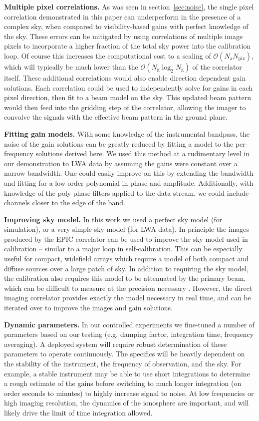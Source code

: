 \documentclass[a4paper,fleqn,usenatbib]{mnras}
\newcommand{\Nant}{\ensuremath{N_{\mathrm{a}}}}
\newcommand{\Ng}{\ensuremath{N_{\mathrm{g}}}}
\begin{document}
\textbf{Multiple pixel correlations.} As was seen in section~\ref{sec:noise}, the single pixel correlation demonstrated in this paper can underperform in the presence of a complex sky, when compared to visibility-based gains with perfect knowledge of the sky. These errors can be mitigated by using correlations of multiple image pixels to incorporate a higher fraction of the total sky power into the calibration loop. Of course this increases the computational cost to a scaling of $\mathcal{O}(\Nant N_{\mathrm{pix}})$, which will typically be much lower than the $\mathcal{O}(\Ng \log_2 \Ng)$ of the correlator itself. These additional correlations would also enable direction dependent gain solutions. Each correlation could be used to independently solve for gains in each pixel direction, then fit to a beam model on the sky. This updated beam pattern would then feed into the gridding step of the correlator, allowing the imager to convolve the signals with the effective beam pattern in the ground plane. 

\textbf{Fitting gain models.} With some knowledge of the instrumental bandpass, the noise of the gain solutions can be greatly reduced by fitting a model to the per-frequency solutions derived here. We used this method at a rudimentary level in our demonstration to LWA data by assuming the gains were constant over a narrow bandwidth. One could easily improve on this by extending the bandwidth and fitting for a low order polynomial in phase and amplitude. Additionally, with knowledge of the poly-phase filters applied to the data stream, we could include channels closer to the edge of the band.

\textbf{Improving sky model.} In this work we used a perfect sky model (for simulation), or a very simple sky model (for LWA data). In principle the images produced by the EPIC correlator can be used to improve the sky model used in calibration -- similar to a major loop in self-calibration. This can be especially useful for compact, widefield arrays which require a model of both compact and diffuse sources over a large patch of sky. In addition to requiring the sky model, the calibration also requires this model to be attenuated by the primary beam, which can be difficult to measure at the precision necessary \citep[e.g.][]{neb15,vir14,thy15b}. However, the direct imaging correlator provides exactly the model necessary in real time, and can be iterated over to improve the images and gain solutions.

\textbf{Dynamic parameters.} In our controlled experiments we fine-tuned a number of parameters based on our testing (e.g. damping factor, integration time, frequency averaging). A deployed system will require robust determination of these parameters to operate continuously. The specifics will be heavily dependent on the stability of the instrument, the frequency of observation, and the sky. For example, a stable instrument may be able to use short integrations to determine a rough estimate of the gains before switching to much longer integration (on order seconds to minutes) to highly increase signal to noise. At low frequencies or high imaging resolution, the dynamics of the ionosphere are important, and will likely drive the limit of time integration allowed.
\end{document}

